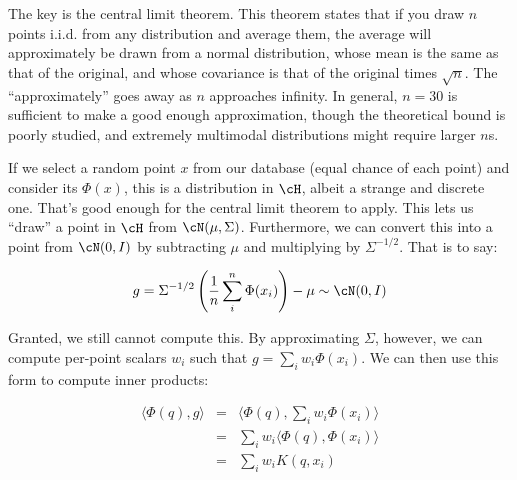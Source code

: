 \documentclass[twoside,11pt]{homework}
\begin{document}
\begin{multicols}{2}
The key is the central limit theorem.  This theorem states that if you
draw $n$ points i.i.d. from any distribution and average
them, the average will approximately be drawn from a normal
distribution, whose mean is the same as that of the original, and
whose covariance is that of the original times $\sqrt{n}$.  The
``approximately'' goes away as $n$ approaches infinity.  In general,
$n=30$ is sufficient to make a good enough approximation, though the
theoretical bound is poorly studied, and extremely multimodal
distributions might require larger $n$s.

If we select a random point $x$ from our database (equal chance of
each point) and consider its $\Phi(x)$, this is a distribution in
$\cH$, albeit a strange and discrete one.  That's good enough for the
central limit theorem to apply.  This lets us ``draw'' a point in
$\cH$ from $\cN(\mu,\Sigma)$.  Furthermore, we can convert this into a
point from $\cN(0,I)$ by subtracting $\mu$ and multiplying by
$\Sigma^{-1/2}$.  That is to say:

\begin{equation*}
  g = \Sigma^{-1/2}\left(\frac{1}{n}\sum_i^n \Phi(x_i) \right) - \mu  \sim \cN(0,I)
\end{equation*}

Granted, we still cannot compute this.  By approximating $\Sigma$,
however, we can compute per-point scalars $w_i$ such that $g=\sum_i
w_i\Phi(x_i)$.  We can then use this form to compute
inner products:

\begin{eqnarray*}
  \langle \Phi(q), g \rangle
  & = & \langle \Phi(q), \sum_i w_i\Phi(x_i) \rangle \\
  & = & \sum_i w_i \langle \Phi(q), \Phi(x_i) \rangle \\
  & = & \sum_i w_i K(q, x_i) \\
\end{eqnarray*}




\end{multicols}
\end{document}
